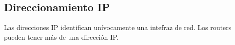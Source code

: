 \subsection{Direccionamiento IP}

Las direcciones IP identifican unívocamente una intefraz de red. Los routers pueden tener más de una dirección IP. 









